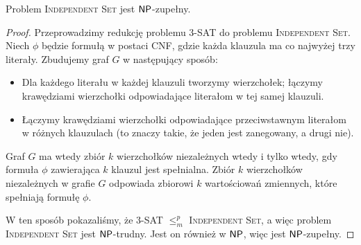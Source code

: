 \begin{theorem}\label{t:Independent Set}
    Problem \textsc{Independent Set} jest $\textsf{NP}$-zupełny.
\end{theorem}
\begin{proof}
    Przeprowadzimy redukcję problemu 3-SAT do problemu \textsc{Independent Set}. Niech $\phi$ będzie formułą w postaci CNF, gdzie każda klauzula ma co najwyżej trzy literały. Zbudujemy graf $G$ w następujący sposób:
    \begin{itemize}
        \item Dla każdego literału w każdej klauzuli tworzymy wierzchołek; łączymy krawędziami wierzchołki odpowiadające literałom w tej samej klauzuli.
        \item Łączymy krawędziami wierzchołki odpowiadające przeciwstawnym literałom w różnych klauzulach (to znaczy takie, że jeden jest zanegowany, a drugi nie).
    \end{itemize}
    Graf $G$ ma wtedy zbiór $k$ wierzchołków niezależnych wtedy i tylko wtedy, gdy formuła $\phi$ zawierająca $k$ klauzul jest spełnialna. Zbiór $k$ wierzchołków niezależnych w grafie $G$ odpowiada zbiorowi $k$ wartościowań zmiennych, które spełniają formułę $\phi$.

    W ten sposób pokazaliśmy, że 3-SAT $\leq_m^p$ \textsc{Independent Set}, a więc problem \textsc{Independent Set} jest $\textsf{NP}$-trudny. Jest on również w $\textsf{NP}$, więc jest $\textsf{NP}$-zupełny.
\end{proof}

